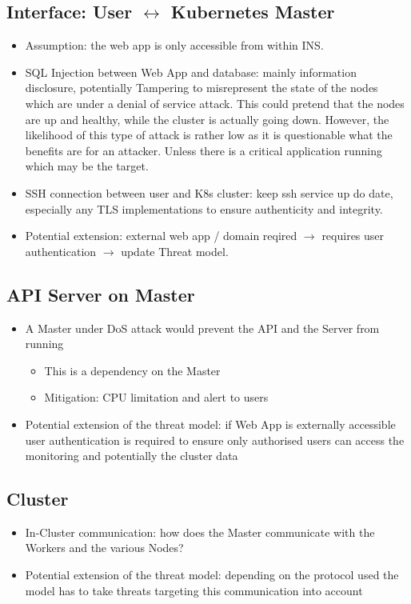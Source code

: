 \subsection{Interface: User \(\leftrightarrow\) Kubernetes Master}
\begin{itemize}
    \item Assumption: the web app is only accessible from within INS.
    \item SQL Injection between Web App and database: mainly information disclosure, potentially Tampering to misrepresent the state of the nodes which are under a denial of service attack. This could pretend that the nodes are up and healthy, while the cluster is actually going down. However, the likelihood of this type of attack is rather low as it is questionable what the benefits are for an attacker. Unless there is a critical application running which may be the target.
    \item SSH connection between user and K8s cluster: keep ssh service up do date, especially any TLS implementations to ensure authenticity and integrity.
    \item Potential extension: external web app / domain reqired \(\rightarrow\) requires user authentication \(\rightarrow\) update Threat model.
\end{itemize}

\subsection{API Server on Master}
\begin{itemize}
    \item A Master under DoS attack would prevent the API and the Server from running
        \begin{itemize}
            \item This is a dependency on the Master
            \item Mitigation: CPU limitation and alert to users
        \end{itemize}
    \item Potential extension of the threat model: if Web App is externally accessible user authentication is required to ensure only authorised users can access the monitoring and potentially the cluster data
\end{itemize}

\subsection{Cluster}
\begin{itemize}
    \item In-Cluster communication: how does the Master communicate with the Workers and the various Nodes?
    \item Potential extension of the threat model: depending on the protocol used the model has to take threats targeting this communication into account
\end{itemize}


